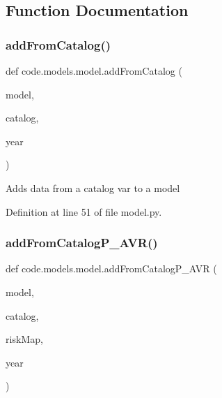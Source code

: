 \subsection{Function Documentation}
\mbox{\label{namespacecode_1_1models_1_1model_aa5b70c0dbb95cdcca3fae1082f4b4a93}} 
\subsubsection{\texorpdfstring{add\+From\+Catalog()}{addFromCatalog()}}
{\footnotesize\ttfamily def code.\+models.\+model.\+add\+From\+Catalog (\begin{DoxyParamCaption}\item[{}]{model,  }\item[{}]{catalog,  }\item[{}]{year }\end{DoxyParamCaption})}

\begin{DoxyVerb}Adds data from a catalog var to a model
\end{DoxyVerb}
 

Definition at line 51 of file model.\+py.

\mbox{\label{namespacecode_1_1models_1_1model_ad191be2a9a695565c7e247a98bb0a795}} 
\subsubsection{\texorpdfstring{add\+From\+Catalog\+P\+\_\+\+A\+V\+R()}{addFromCatalogP\_AVR()}}
{\footnotesize\ttfamily def code.\+models.\+model.\+add\+From\+Catalog\+P\+\_\+\+A\+VR (\begin{DoxyParamCaption}\item[{}]{model,  }\item[{}]{catalog,  }\item[{}]{risk\+Map,  }\item[{}]{year }\end{DoxyParamCaption})}

